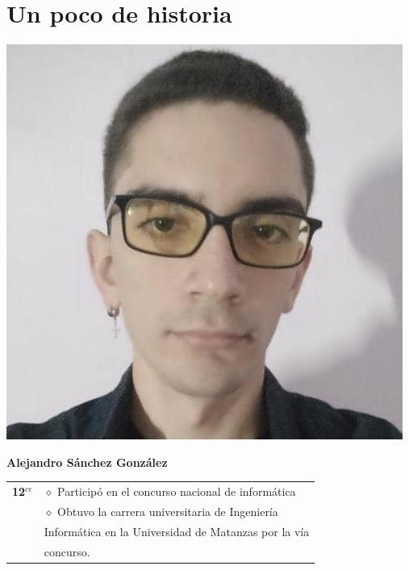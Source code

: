 \pagestyle{fancy}
\lhead{}
\chead{}
\chapter*{Un poco de historia}


\begin{minipage}{0.2\textwidth}
	\includegraphics[width=\linewidth]{img/concursantes/alejandro_sanchez.png} %
\end{minipage}
\hfill
\begin{minipage}{0.7\textwidth}
	\textbf{Alejandro Sánchez González}
	
	\vspace*{0.1in}
	\begin{longtable}{rl}
		\textbf{12$^{ce}$} & $\diamond$ Participó en el concurso nacional de informática\\
		& $\diamond$ Obtuvo la carrera universitaria de Ingeniería \\
		& Informática en la Universidad de Matanzas por la vía \\
		& concurso.
		
	\end{longtable}
	
\end{minipage}

